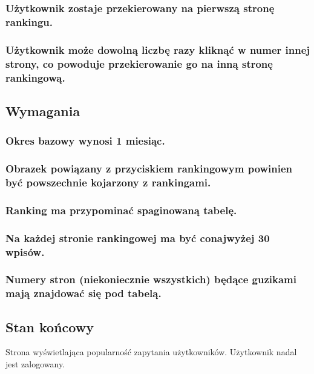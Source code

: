 \documentclass[a4paper]{article}
\begin{document}
\subsubsection{Użytkownik zostaje przekierowany na pierwszą stronę rankingu.}
\subsubsection{Użytkownik może dowolną liczbę razy kliknąć w numer innej strony, co powoduje przekierowanie go na inną stronę rankingową.}


\subsection{Wymagania}


\subsubsection{Okres bazowy wynosi 1 miesiąc. \label{okres-bazowy}}
\subsubsection{Obrazek powiązany z przyciskiem rankingowym powinien być powszechnie kojarzony z rankingami.}
\subsubsection{Ranking ma przypominać spaginowaną tabelę.}
\subsubsection{Na każdej stronie rankingowej ma być conajwyżej 30 wpisów.}
\subsubsection{Numery stron (niekoniecznie wszystkich) będące guzikami mają znajdować się pod tabelą.}

\subsection*{Stan końcowy}
Strona wyświetlająca popularność zapytania użytkowników. Użytkownik nadal jest zalogowany.


\newpage
\end{document}
